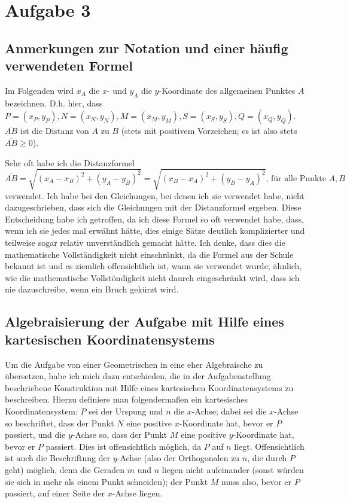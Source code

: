 \section{Aufgabe 3}

\subsection*{Anmerkungen zur Notation und einer häufig verwendeten Formel}

Im Folgenden wird $x_A$ die $x$- und $y_A$ die $y$-Koordinate des allgemeinen Punktes $A$ bezeichnen. D.h. hier, dass 
$P=(x_P, y_P), N=(x_N, y_N), M=(x_M, y_M), S=(x_S, y_S), Q=(x_Q, y_Q)$.\\
$\overline{AB}$ ist die Distanz von $A$ zu $B$ (stets mit positivem Vorzeichen; es ist also stets $\overline{AB}
\geq 0$).

Sehr oft habe ich die Distanzformel 
\[\overline{AB}=\sqrt{(x_A-x_B)^2+(y_A-y_B)^2}=\sqrt{(x_B-x_A)^2+(y_B-y_A)^2}\text{, für alle Punkte $A,B$}\] 
verwendet. Ich habe bei den Gleichungen, bei denen ich sie verwendet habe, nicht dazugeschrieben, dass sich die 
Gleichungen mit der Distanzformel ergeben. Diese Entscheidung habe ich getroffen, da ich diese Formel so oft verwendet 
habe, dass, wenn ich sie jedes mal erwähnt hätte, dies einige Sätze deutlich komplizierter und teilweise sogar 
relativ unverständlich gemacht hätte. Ich denke, dass dies die mathematische Vollständigkeit nicht einschränkt, da 
die Formel aus der Schule bekannt ist und es ziemlich offensichtlich ist, wann sie verwendet wurde; ähnlich, wie 
die mathematische Vollstöndigkeit nicht daurch eingeschränkt wird, dass ich nie dazuschreibe, wenn ein Bruch 
gekürzt wird.

\subsection*{Algebraisierung der Aufgabe mit Hilfe eines kartesischen Koordinatensystems}

Um die Aufgabe von einer Geometrischen in eine eher Algebraische zu übersetzen, habe ich mich dazu entschieden, die 
in der Aufgabenstellung beschriebene Konstruktion mit Hilfe eines kartesischen Koordinatensystems zu beschreiben. 
Hierzu definiere man folgendermaßen ein kartesisches Koordinatensystem: $P$ sei der Urspung und $n$ die $x$-Achse; 
dabei sei die $x$-Achse so beschriftet, dass der Punkt $N$ eine positive $x$-Koordinate hat, bevor er $P$ passiert, 
und die $y$-Achse so, dass der Punkt $M$ eine positive $y$-Koordinate hat, bevor er $P$ passiert. Dies ist 
offensichtlich möglich, da $P$ auf $n$ liegt. Offensichtlich ist auch die Beschriftung der $y$-Achse (also der 
Orthogonalen zu $n$, die durch $P$ geht) möglich, denn die Geraden $m$ und $n$ liegen nicht aufeinander (sonst 
würden sie sich in mehr als einem Punkt schneiden); der Punkt $M$ muss also, bevor er $P$ passiert, auf einer Seite 
der $x$-Achse liegen.

